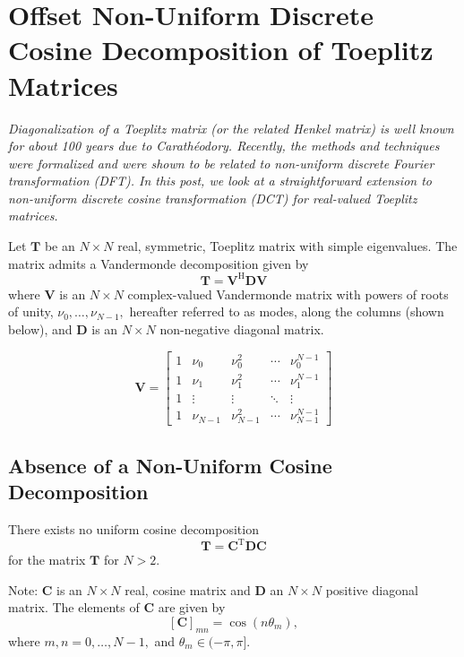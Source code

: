 \section{Offset Non-Uniform Discrete Cosine Decomposition of Toeplitz Matrices}

\emph{Diagonalization of a Toeplitz matrix (or the related Henkel matrix) is well known for about 100 years due to Carathéodory. Recently, the methods and techniques were formalized and were shown to be related to non-uniform discrete Fourier transformation (DFT). In this post, we look at a straightforward extension to non-uniform discrete cosine transformation (DCT) for real-valued Toeplitz matrices.}

Let $\boldsymbol{T}$ be an $N\times N$ real, symmetric, Toeplitz matrix with simple eigenvalues. The matrix admits a Vandermonde decomposition \cite{Boley1997, Backstrom2013} given by \[\boldsymbol{T} = \boldsymbol{V}^\text{H} \boldsymbol{D} \boldsymbol{V}\] where $\boldsymbol{V}$ is an $N\times N$ complex-valued Vandermonde matrix with powers of roots of unity, $\nu_0, \dots, \nu_{N-1},$ hereafter referred to as modes, along the columns (shown below), and $\boldsymbol{D}$ is an $N\times N$ non-negative diagonal matrix.

\[
\boldsymbol{V} = \begin{bmatrix} 1 & \nu_0 & \nu_0^2 & \cdots & \nu_0^{N-1} \\
	1 & \nu_1 & \nu_1^2 & \cdots & \nu_1^{N-1} \\
	1 & \vdots &  \vdots & \ddots & \vdots \\
	1 & \nu_{N-1} & \nu_{N-1}^2 & \cdots & \nu_{N-1}^{N-1}
\end{bmatrix}
\]

\subsection{Absence of a Non-Uniform Cosine Decomposition}

\begin{theorem}
There exists no uniform cosine decomposition \[\boldsymbol{T} = \boldsymbol{C}^\text{T} \boldsymbol{D} \boldsymbol{C}\] for the matrix $\boldsymbol{T}$ for $N > 2.$
\end{theorem}

Note: $\boldsymbol{C}$ is an $N\times N$ real, cosine matrix and $\boldsymbol{D}$ an $N\times N$ positive diagonal matrix. The elements of $\boldsymbol{C}$ are given by  \[ [\boldsymbol{C}]_{mn} = \cos(n \theta_m), \]
where $m, n = 0,\dots, N - 1,$ and $\theta_m \in (-\pi,\pi].$

